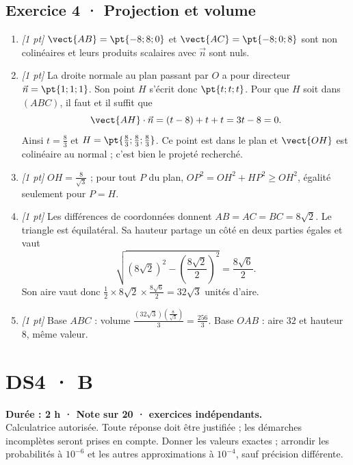 \subsection*{Exercice 4 · Projection et volume}\begin{enumerate}

\item \textit{[1 pt]} $\vect{AB}=\pt{-8;8;0}$ et $\vect{AC}=\pt{-8;0;8}$ sont non colinéaires et leurs produits scalaires avec $\vec n$ sont nuls.

\item \textit{[1 pt]} La droite normale au plan passant par $O$ a pour directeur $\vec n=\pt{1;1;1}$. Son point $H$ s'écrit donc $\pt{t;t;t}$. Pour que $H$ soit dans $(ABC)$, il faut et il suffit que
\[\vect{AH}\cdot\vec n=(t-8)+t+t=3t-8=0.\]
Ainsi $t=\frac{8}{3}$ et $H=\pt{\frac{8}{3};\frac{8}{3};\frac{8}{3}}$. Ce point est dans le plan et $\vect{OH}$ est colinéaire au normal ; c'est bien le projeté recherché.

\item \textit{[1 pt]} $OH=\frac{8}{\sqrt{3}}$ ; pour tout $P$ du plan, $OP^2=OH^2+HP^2\ge OH^2$, égalité seulement pour $P=H$.

\item \textit{[1 pt]} Les différences de coordonnées donnent $AB=AC=BC=8\sqrt2$. Le triangle est équilatéral. Sa hauteur partage un côté en deux parties égales et vaut
\[\sqrt{(8\sqrt2)^2-(\frac{8\sqrt{2}}{2})^2}=\frac{8\sqrt6}{2}.\]
Son aire vaut donc $\frac12\times 8\sqrt2\times\frac{8\sqrt6}{2}=32\sqrt3$ unités d'aire.

\item \textit{[1 pt]} Base $ABC$ : volume $\frac{(32\sqrt3)(\frac{8}{\sqrt{3}})}{3}=\frac{256}{3}$. Base $OAB$ : aire $32$ et hauteur $8$, même valeur.

\end{enumerate}

\fi

\fi

\ifmxteacher

\mxnewpage{}\label{sujet:6-4}

\section*{DS4 · B}


\textbf{Durée : 2 h · Note sur 20 ·  exercices indépendants.}\\Calculatrice autorisée. Toute réponse doit être justifiée ; les démarches incomplètes seront prises en compte. Donner les valeurs exactes ; arrondir les probabilités à $10^{-6}$ et les autres approximations à $10^{-4}$, sauf précision différente.

